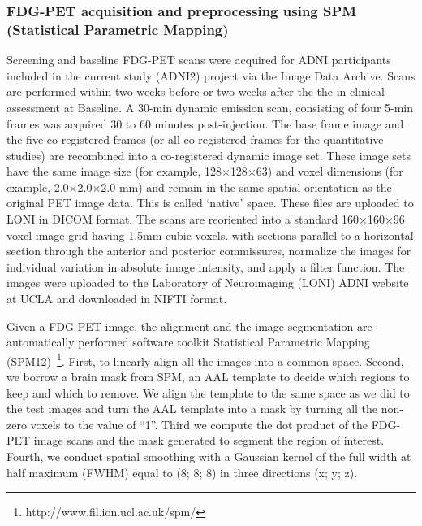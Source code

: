 \documentclass[authoryear,preprint,revi	ew,12pt]{elsarticle}
\begin{document}
\subsubsection{FDG-PET acquisition and preprocessing using SPM (Statistical Parametric Mapping)}
\label{sec:preprocess}
Screening and baseline FDG-PET scans were acquired for ADNI participants included in the current study (ADNI2) project via the Image Data Archive. Scans are performed within two weeks before or two weeks after the the in-clinical assessment at Baseline. A 30-min dynamic emission scan, consisting of four 5-min frames was acquired  30 to 60 minutes post-injection. The base frame image and the five co-registered frames (or all co-registered frames for the quantitative studies) are recombined into a co-registered dynamic image set. These image sets have the same image size (for example, 128$ \times $128$ \times $63) and voxel dimensions (for example, 2.0$ \times $2.0$ \times $2.0 mm) and remain in the same spatial orientation as the original PET image data. This is called ‘native’ space. These files are uploaded to LONI in DICOM format. The scans are reoriented into a standard 160$ \times $160$ \times $96 voxel image grid having 1.5mm cubic voxels. with sections parallel to a horizontal section through the anterior and posterior commissures, normalize the images for individual variation in absolute image intensity, and apply a filter function. The images were uploaded to the Laboratory of Neuroimaging (LONI) ADNI website at UCLA and downloaded in NIFTI format.

Given a FDG-PET image, the alignment and the image segmentation are automatically performed  software toolkit Statistical Parametric Mapping (SPM12)~\citep{penny2011statistical}\footnote{http://www.fil.ion.ucl.ac.uk/spm/}. First, to linearly align all the images into a common space. Second, we borrow a brain mask from SPM, an AAL template to decide which regions to keep and which to remove. We align the template to the same space as we did to the test images and turn the AAL template into a mask by turning all the non-zero voxels to the value of ``1''. Third we compute the dot product of the FDG-PET image scans and the mask generated to segment the region of interest. Fourth, we conduct spatial smoothing with a Gaussian kernel of the full width at half maximum (FWHM) equal to (8; 8; 8) in three directions (x; y; z).

\end{document}
